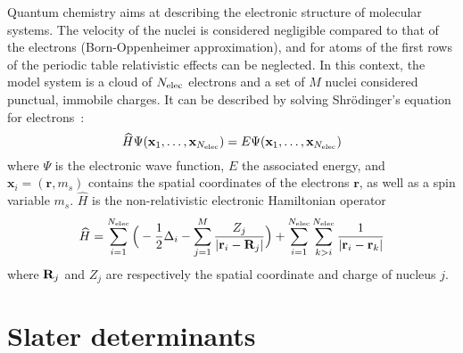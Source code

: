 \documentclass[./thesis.tex]{subfiles}
\begin{document}
\label{chap:METHODS}

Quantum chemistry aims at describing the electronic structure of molecular
systems.  The velocity of the nuclei is considered negligible compared to that
of the electrons (Born-Oppenheimer approximation), and for atoms of the first
rows of the periodic table relativistic effects can be neglected.  In this
context, the model system is a cloud of ${N_\text{elec}}$ electrons and a set of $M$ nuclei
considered punctual, immobile charges. It can be described by solving
Shrödinger's equation for electrons~:
\begin{equation}
 \widehat{H} \Psi({\bf x}_1,\dots,{\bf x}_{N_\text{elec}}) = E \Psi({\bf x}_1,\dots,{\bf x}_{N_\text{elec}})
\end{equation}
where $\Psi$ is the electronic wave function, $E$ the associated energy, and $\mathbf{x}_i = (\textbf{r},m_s)$
contains the spatial coordinates of the electrons $\textbf{r}$, as well as a spin variable $m_s$.
$\widehat H$ is the non-relativistic electronic Hamiltonian operator
\begin{equation}
\widehat{H} = \sum_{i=1}^{{N_\text{elec}}} \Big ( -\frac{1}{2} \Delta_i - \sum_{j=1}^M \frac{Z_j}{|{\bf r}_i - {\bf R}_j|} \Big ) + \sum_{i=1}^{{N_\text{elec}}} \sum_{k>i}^{{N_\text{elec}}} \frac{1}{|{\bf r}_i - {\bf r}_k|}
\end{equation}
where ${\bf R}_j$ and $Z_j$ are respectively the spatial coordinate and charge of nucleus $j$.

\section{Slater determinants}
\end{document}
